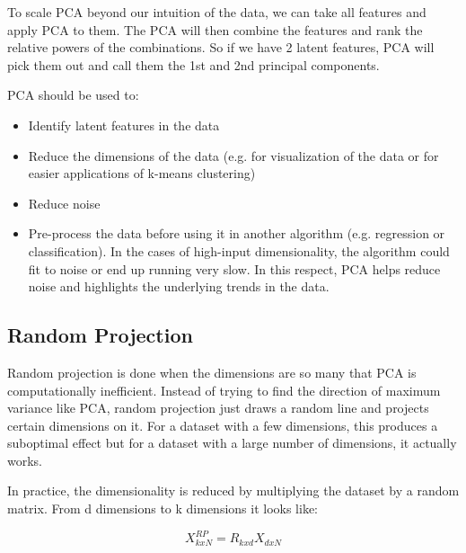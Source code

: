 \documentclass{article}
\begin{document}
To scale PCA beyond our intuition of the data, we can take all features and apply PCA to them. The PCA will then combine the features and rank the relative powers of the combinations. So if we have 2 latent features, PCA will pick them out and call them the 1st and 2nd principal components.

PCA should be used to:

\begin{itemize}
  \item Identify latent features in the data
  \item Reduce the dimensions of the data (e.g. for visualization of the data or for easier applications of k-means clustering)
  \item Reduce noise
  \item Pre-process the data before using it in another algorithm (e.g. regression or classification). In the cases of high-input dimensionality, the algorithm could fit to noise or end up running very slow. In this respect, PCA helps reduce noise and highlights the underlying trends in the data.
\end{itemize}

\subsection{Random Projection}
Random projection is done when the dimensions are so many that PCA is computationally inefficient. Instead of trying to find the direction of maximum variance like PCA, random projection just draws a random line and projects certain dimensions on it. For a dataset with a few dimensions, this produces a suboptimal effect but for a dataset with a large number of dimensions, it actually works.

In practice, the dimensionality is reduced by multiplying the dataset by a random matrix. From d dimensions to k dimensions it looks like:

\begin{equation}
  X_{kxN}^{RP} = R_{kxd} X_{dxN}
\end{equation}
\end{document}
